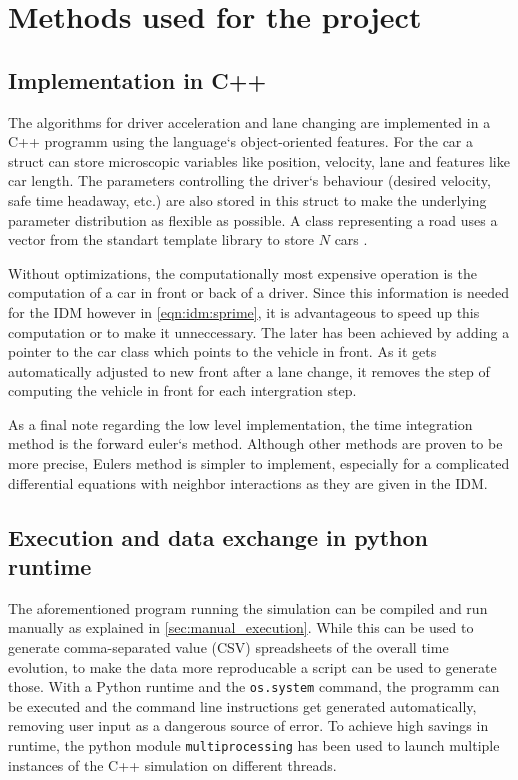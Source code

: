 \section{Methods used for the project}
\label{sec:methods}

\subsection{Implementation in C++}
\label{sec:implementation}
The algorithms for driver acceleration and lane changing are implemented in a C++ programm using the language`s
object-oriented features. For the car a struct can store microscopic variables like position, velocity, lane and
features like car length. The parameters controlling the driver`s behaviour (desired velocity, safe time headaway, etc.)
are also stored in this struct to make the underlying parameter distribution as flexible as possible. A class
representing a road uses a vector from the standart template library to store $N$ cars \cite{cpp-vector}.

Without optimizations, the computationally most expensive operation is the computation of a car in front or back of a
driver. Since this information is needed for the IDM however in \autoref{eqn:idm:sprime}, it is advantageous to speed up
this computation or to make it unneccessary. The later has been achieved by adding a pointer to the car class which
points to the vehicle in front. As it gets automatically adjusted to new front after a lane change, it removes the step
of computing the vehicle in front for each intergration step.

As a final note regarding the low level implementation, the time integration method is the forward
euler`s method. Although other methods are proven to be more precise, Eulers method is simpler to
implement, especially for a complicated differential equations with neighbor interactions as they 
are given in the IDM.

\subsection{Execution and data exchange in python runtime}
The aforementioned program running the simulation can be compiled and run manually as explained in 
\ref{sec:manual_execution}.
While this can be used to generate comma-separated value (CSV) spreadsheets of the overall time
evolution, to make the data more reproducable a script can be used to generate those. 
With a Python runtime and the
\texttt{os.system}
command, the programm can be executed and the command line instructions get generated automatically, 
removing user input as a dangerous source of error. To achieve high savings in runtime, the python module 
\texttt{multiprocessing} has been used to launch multiple instances of the C++ simulation on different 
threads. 


